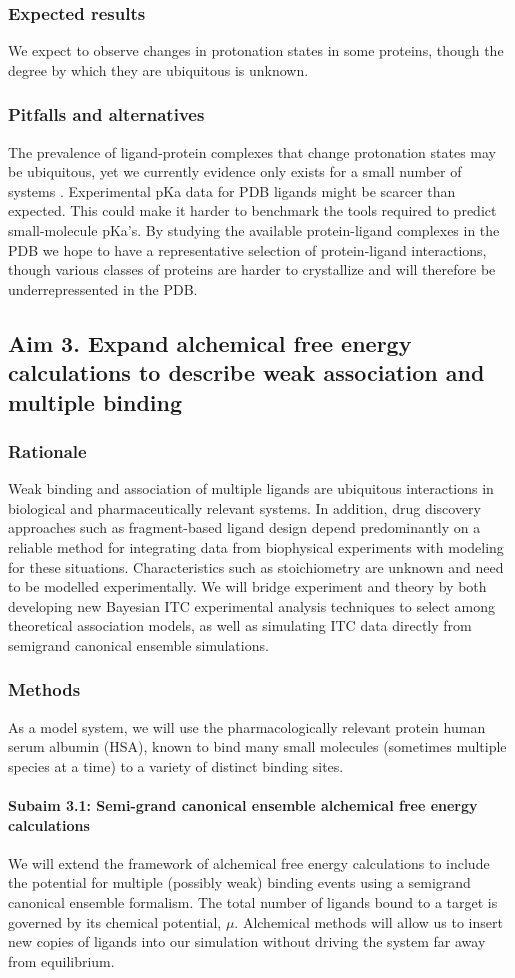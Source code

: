 \documentclass[10pt]{article}
\newcommand{\subsubsubsection}[1]{\paragraph*{#1}}
\begin{document}
\subsubsection*{Expected results}
We expect to observe changes in protonation states in some proteins, though the degree by which they are ubiquitous is unknown.
\subsubsection*{Pitfalls and alternatives}
The prevalence of ligand-protein complexes that change protonation states may be ubiquitous, yet we currently evidence only exists for a small number of systems \cite{Aleksandrov2007a,Czodrowski2007a}.
Experimental pKa data for PDB ligands might be scarcer than expected. This could make it harder to benchmark the tools required to predict small-molecule pKa's.
By studying the available protein-ligand complexes in the PDB we hope to have a representative selection of protein-ligand interactions, though various classes of proteins are harder to crystallize and will therefore be underrepressented in the PDB.


\subsection*{Aim 3. Expand alchemical free energy calculations to describe weak association and multiple binding}
\subsubsection*{Rationale}
Weak binding and association of multiple ligands are ubiquitous interactions in biological and pharmaceutically relevant systems.
In addition, drug discovery approaches such as fragment-based ligand design depend predominantly on a reliable method for integrating data from biophysical experiments with modeling for these situations. Characteristics such as stoichiometry are unknown and need to be modelled experimentally.
We will bridge experiment and theory by both developing new Bayesian ITC experimental analysis techniques to select among theoretical association models, as well as simulating ITC data directly from semigrand canonical ensemble simulations.
\subsubsection*{Methods}
As a model system, we will use the pharmacologically relevant protein human serum albumin (HSA), known to bind many small molecules (sometimes multiple species at a time) to a variety of distinct binding sites.
\subsubsubsection{Subaim 3.1: Semi-grand canonical ensemble alchemical free energy calculations}
We will extend the framework of alchemical free energy calculations to include the potential for multiple (possibly weak) binding events using a semigrand canonical ensemble formalism. The total number of ligands bound to a target is governed by its chemical potential, $\mu$. Alchemical methods will allow us to insert new copies of ligands into our simulation without driving the system far away from equilibrium. 
\end{document}

